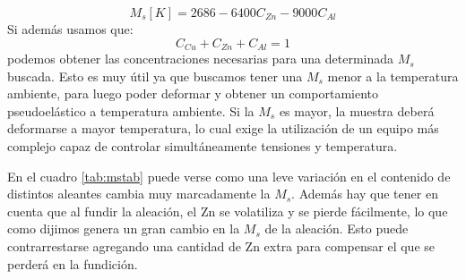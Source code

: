 \documentclass[a4paper,12pt,fleqn,twoside,openany]{book}
\begin{document}
\begin{equation}
M_s[K]=2686-6400C_{Zn}-9000C_{Al} \label{Ms} 
\end{equation}
Si además usamos que:
\begin{equation}
     C_{Cu}+C_{Zn}+C_{Al}=1
\end{equation}
podemos obtener las concentraciones necesarias para una determinada $M_{s}$ buscada. Esto es muy útil ya que buscamos tener una $M_{s}$ menor a la temperatura ambiente, para 
luego poder deformar y obtener un comportamiento pseudoelástico a temperatura ambiente. Si la $M_{s}$ es mayor, la muestra deberá deformarse a mayor temperatura, lo 
cual exige la utilización de un equipo más complejo capaz de controlar simultáneamente tensiones y temperatura.


En el cuadro \ref{tab:mstab} puede verse como una leve variación en el contenido de distintos aleantes cambia muy marcadamente la $M_s$. Además hay que 
tener en cuenta que al fundir la aleación, el Zn se volatiliza y se pierde fácilmente, lo que como dijimos genera un gran cambio en la $M_s$ de la aleación. Esto 
puede contrarrestarse agregando una cantidad de Zn extra para compensar el que se perderá en la fundición.

\end{document}
